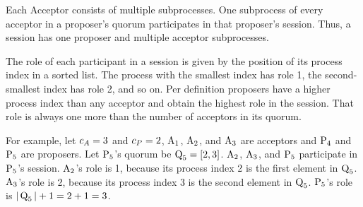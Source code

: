 Each Acceptor consists of multiple subprocesses.
One subprocess of every acceptor in a proposer's quorum participates in that proposer's session.
Thus, a session has one proposer and multiple acceptor subprocesses.

The role of each participant in a session is given by the position of its process index in a sorted list.
The process with the smallest index has role 1, the second-smallest index has role 2, and so on.
Per definition proposers have a higher process index than any acceptor and obtain the highest role in the session.
That role is always one more than the number of acceptors in its quorum.

For example, let $c_A = 3$ and $c_P = 2$, $\operatorname{A_{1}}$, $\operatorname{A_{2}}$, and $\operatorname{A_{3}}$ are acceptors and $\operatorname{P_{4}}$ and $\operatorname{P_{5}}$ are proposers.
Let $\operatorname{P_{5}}$'s quorum be $\operatorname{Q}_5 = \left[2, 3\right]$.
$\operatorname{A_{2}}$, $\operatorname{A_{3}}$, and $\operatorname{P_{5}}$ participate in $\operatorname{P_{5}}$'s session.
$\operatorname{A_{2}}$'s role is 1, because its process index 2 is the first element in $\operatorname{Q}_5$.
$\operatorname{A_{3}}$'s role is 2, because its process index 3 is the second element in $\operatorname{Q}_5$.
$\operatorname{P_{5}}$'s role is $|\operatorname{Q}_5| + 1 = 2 + 1 = 3$.

